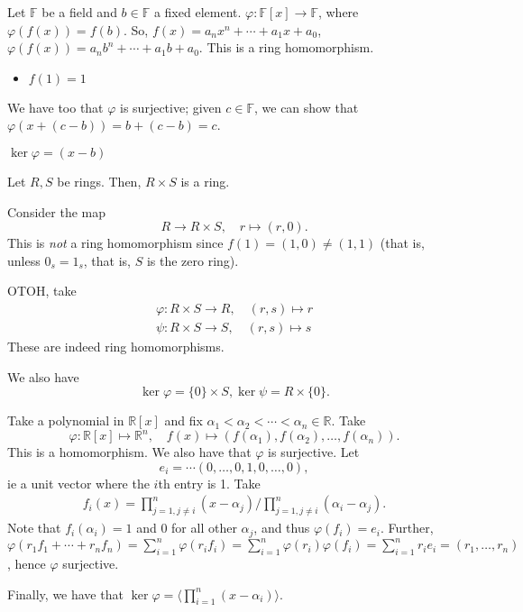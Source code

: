 \documentclass[12pt,oneside]{article}
\begin{document}
\begin{example}
  Let $\mathbb{F}$ be a field and $b \in \mathbb{F}$ a fixed element. $\varphi : \mathbb{F}[x] \to \mathbb{F}$, where $\varphi(f(x)) = f(b)$. So, $f(x) = a_n x^n + \cdots + a_1 x + a_0$, $\varphi (f(x)) = a_n b^n + \cdots + a_1 b + a_0$. This is a ring homomorphism.
  \begin{itemize}
    \item $f(1) = 1$
  \end{itemize}
  We have too that $\varphi$ is surjective; given $c \in \mathbb{F}$, we can show that $\varphi(x + (c - b)) = b + (c- b) = c$. 

  $\ker \varphi = (x-b)$ %
\end{example}

\begin{example}
Let $R, S$ be rings. Then, $R \times S$ is a ring. %
\end{example}

\begin{example}
  Consider the map \[
  R \to R \times S, \quad r \mapsto (r,0).
  \]
  This is \emph{not} a ring homomorphism since $f(1) = (1,0) \neq (1,1)$ (that is, unless $0_s = 1_s$, that is, $S$ is the zero ring).

  OTOH, take 
  \begin{align*}
    \varphi : R \times S \to R, \quad (r,s) \mapsto r\\
    \psi : R \times S \to S, \quad (r,s) \mapsto s
  \end{align*}
  These are indeed ring homomorphisms. %

  We also have \[\ker \varphi = \{0\} \times S, \ker \psi = R \times \{0\}.\]
\end{example}

\begin{example}
  Take a polynomial in $\mathbb{R}[x]$ and fix $\alpha_1 < \alpha_2 < \cdots < \alpha_n \in \mathbb{R}$. Take \[
  \varphi : \mathbb{R}[x] \mapsto \mathbb{R}^n, \quad f(x) \mapsto (f(\alpha_1), f(\alpha_2), \dots, f(\alpha_n)).
  \]
  This is a homomorphism. %
  We also have that $\varphi$ is surjective. Let $$e_i = \cdots(0, \dots, 0, 1, 0, \dots, 0),$$ ie a unit vector where the $i$th entry is 1. Take \begin{align*}
    f_i(x) = \prod_{j=1, j \neq i}^n (x - \alpha_j)/ \prod_{j=1, j \neq i}^n (\alpha_i-\alpha_j).
  \end{align*}
  Note that $f_i(\alpha_i) = 1$ and $0$ for all other $\alpha_j$, and thus $\varphi (f_i) = e_i$. Further, $\varphi(r_1 f_1 + \cdots + r_n f_n) = \sum_{i=1}^n \varphi(r_i f_i) = \sum_{i=1}^n \varphi(r_i) \varphi(f_i) = \sum_{i=1}^{n} r_i e_i = (r_1, \dots, r_n)$, hence $\varphi$ surjective.

  Finally, we have that $\ker \varphi = \langle \prod_{i=1}^{n}(x-\alpha_i)\rangle$.
\end{example}
\end{document}
